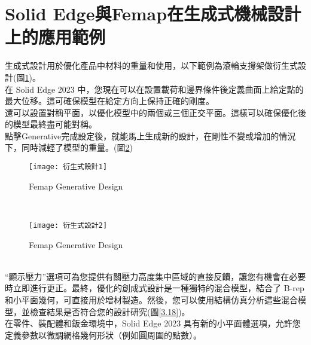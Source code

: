 \section{Solid Edge與Femap在生成式機械設計上的應用範例}
生成式設計用於優化產品中材料的重量和使用，以下範例為滾輪支撐架做衍生式設計(圖\ref{3.16})。\\

在 Solid Edge 2023 中，您現在可以在設置載荷和邊界條件後定義曲面上給定點的最大位移。這可確保模型在給定方向上保持正確的剛度。\\

還可以設置對稱平面，以優化模型中的兩個或三個正交平面。這樣可以確保優化後的模型最終盡可能對稱。\\

點擊Generative完成設定後，就能馬上生成新的設計，在剛性不變或增加的情況下，同時減輕了模型的重量。(圖\ref{3.17})\\
\begin{figure}[hbt!]
\begin{center}
\texttt{[image: 衍生式設計1]}
\caption{\Large Femap Generative Design}\label{3.16}
\end{center}
\end{figure}
\\
\begin{figure}[hbt!]
\begin{center}
\texttt{[image: 衍生式設計2]}
\caption{\Large Femap Generative Design}\label{3.17}
\end{center}
\end{figure}
\\

“顯示壓力”選項可為您提供有關壓力高度集中區域的直接反饋，讓您有機會在必要時立即進行更正。最終，優化的創成式設計是一種獨特的混合模型，結合了 B-rep 和小平面幾何，可直接用於增材製造。然後，您可以使用結構仿真分析這些混合模型，並檢查結果是否符合您的設計研究(圖\ref{3.18})。\\

在零件、裝配體和鈑金環境中，Solid Edge 2023 具有新的小平面體選項，允許您定義參數以微調網格幾何形狀（例如圓周圍的點數）。\\

